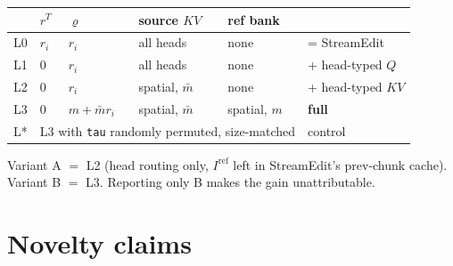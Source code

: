 \documentclass{article}
\begin{document}
\begin{center}
\begin{tabular}{llllll}
\hline
 & $r^{T}$ & $\varrho$ & source $KV$ & ref bank & \\
\hline
L0 & $r_i$ & $r_i$ & all heads & none & = StreamEdit \\
L1 & $0$ & $r_i$ & all heads & none & + head-typed $Q$ \\
L2 & $0$ & $r_i$ & spatial, $\bar m$ & none & + head-typed $KV$ \\
L3 & $0$ & $m + \bar m r_i$ & spatial, $\bar m$ & spatial, $m$ & \textbf{full} \\
L* & \multicolumn{4}{l}{L3 with \texttt{tau} randomly permuted, size-matched} & control \\
\hline
\end{tabular}
\end{center}

Variant A $=$ L2 (head routing only, $I^{\mathrm{ref}}$ left in StreamEdit's
prev-chunk cache). Variant B $=$ L3. Reporting only B makes the gain
unattributable.

\section{Novelty claims}
\end{document}

